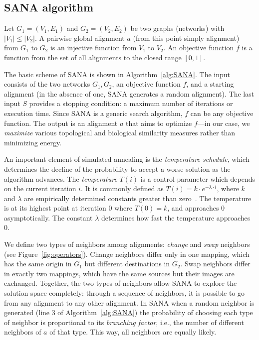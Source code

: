 \documentclass{bioinfo}
\begin{document}
\begin{methods}
\subsection{SANA algorithm}
Let $G_1=(V_1,E_1)$ and $G_2=(V_2,E_2)$ be two graphs (networks) with $|V_1|\leq|V_2|$. A pairwise global alignment $a$ (from this point simply alignment) from $G_1$ to $G_2$ is an injective function from $V_1$ to $V_2$. An objective function $f$ is a function from the set of all alignments to the closed range $[0,1]$.

The basic scheme of SANA is shown in Algorithm~\ref{alg:SANA}. The input consists of the two networks $G_1,G_2$, an objective function $f$, and a starting alignment (in the absence of one, SANA generates a random alignment). The last input $S$ provides a stopping condition: a maximum number of iterations or execution time. Since SANA is a generic search algorithm, $f$ can be any objective function. The output is an alignment $a$ that aims to optimize $f$---in our case, we {\it maximize} various topological and biological similarity measures rather than minimizing energy.

An important element of simulated annealing is the \textit{temperature schedule}, which determines the decline of the probability to accept a worse solution as the algorithm advances. The \textit{temperature} $T(i)$ is a control parameter which depends on the current iteration $i$. It is commonly defined as $T(i)=k\cdot e^{-\lambda\cdot i}$, where $k$ and $\lambda$ are empirically determined constants greater than zero~\citep{SA1}. The temperature is at its highest point at iteration 0 where $T(0)=k$, and approaches 0 asymptotically. The constant $\lambda$ determines how fast the temperature approaches 0.

We define two types of neighbors among alignments: \textit{change} and \textit{swap} neighbors (see Figure~\ref{fig:operators}). Change neighbors differ only in one mapping, which has the same origin in $G_1$ but different destinations in $G_2$. Swap neighbors differ in exactly two mappings, which have the same sources but their images are exchanged. Together, the two types of neighbors allow SANA to explore the solution space completely: through a sequence of neighbors, it is possible to go from any alignment to any other alignment. In SANA when a random neighbor is generated (line 3 of Algorithm~\ref{alg:SANA}) the probability of choosing each type of neighbor is proportional to its \textit{branching factor}, i.e., the number of different neighbors of $a$ of that type. This way, all neighbors are equally likely.


\end{methods}
\end{document}
